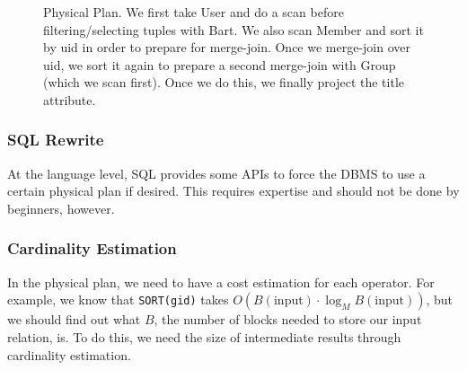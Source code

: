 \documentclass{article}
\begin{document}
\begin{example}
        \begin{figure}[H]
          \centering 
          \caption{Physical Plan. We first take User and do a scan before filtering/selecting tuples with Bart. We also scan Member and sort it by uid in order to prepare for merge-join. Once we merge-join over uid, we sort it again to prepare a second merge-join with Group (which we scan first). Once we do this, we finally project the title attribute. } 
          \label{fig:physical_plan}
        \end{figure}
      \end{example} 

    \subsubsection{SQL Rewrite}

      At the language level, SQL provides some APIs to force the DBMS to use a certain physical plan if desired. This requires expertise and should not be done by beginners, however. 

    \subsubsection{Cardinality Estimation}

      In the physical plan, we need to have a cost estimation for each operator. For example, we know that \texttt{SORT(gid)} takes $O(B(\text{input}) \cdot \log_M B(\text{input}))$, but we should find out what $B$, the number of blocks needed to store our input relation, is. To do this, we need the size of intermediate results through cardinality estimation.  
\end{document}
